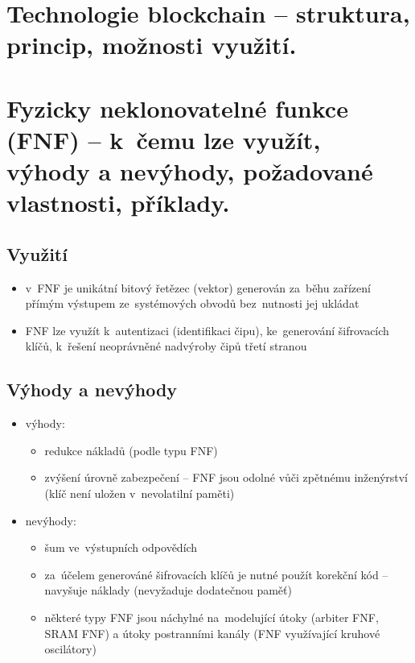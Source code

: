 \clearpage
\section{Technologie blockchain -- struktura, princip, možnosti využití.}

\clearpage
\section{Fyzicky neklonovatelné funkce (FNF) -- k~čemu lze využít, výhody a nevýhody, požadované vlastnosti, příklady.}
\subsection{Využití}
\begin{itemize}
    \item v~FNF je unikátní bitový řetězec (vektor) generován za~běhu zařízení přímým výstupem ze~systémových obvodů bez~nutnosti jej ukládat
    \item FNF lze využít k~autentizaci (identifikaci čipu), ke~generování šifrovacích klíčů, k~řešení neoprávněné nadvýroby čipů třetí stranou
\end{itemize}

\subsection{Výhody a nevýhody}
\begin{itemize}
    \item výhody:
    \begin{itemize}
        \item redukce nákladů (podle typu FNF)
        \item zvýšení úrovně zabezpečení -- FNF jsou odolné vůči zpětnému inženýrství (klíč není uložen v~nevolatilní paměti)
    \end{itemize}
    \item nevýhody:
    \begin{itemize}
        \item šum ve~výstupních odpovědích
        \item za~účelem generováné šifrovacích klíčů je nutné použít korekční kód -- navyšuje náklady (nevyžaduje dodatečnou paměť)
        \item některé typy FNF jsou náchylné na~modelující útoky (arbiter FNF, SRAM FNF) a útoky postranními kanály (FNF využívající kruhové oscilátory)
    \end{itemize}
\end{itemize}

